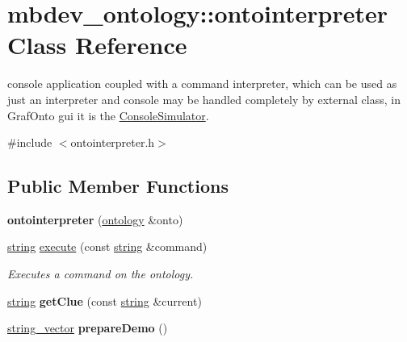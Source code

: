 \hypertarget{classmbdev__ontology_1_1ontointerpreter}{\section{mbdev\-\_\-ontology\-:\-:ontointerpreter \-Class \-Reference}
\label{classmbdev__ontology_1_1ontointerpreter}
}


console application coupled with a command interpreter, which can be used as just an interpreter and console may be handled completely by external class, in \-Graf\-Onto gui it is the \hyperlink{class_console_simulator}{\-Console\-Simulator}.  




{\ttfamily \#include $<$ontointerpreter.\-h$>$}

\subsection*{\-Public \-Member \-Functions}
\begin{DoxyCompactItemize}
\item 
\hypertarget{classmbdev__ontology_1_1ontointerpreter_a505d6a869c6b910cdce6dd993db88770}{{\bfseries ontointerpreter} (\hyperlink{classmbdev__ontology_1_1ontology}{ontology} \&onto)}\label{classmbdev__ontology_1_1ontointerpreter_a505d6a869c6b910cdce6dd993db88770}

\item 
\hyperlink{classmbdev_1_1string}{string} \hyperlink{classmbdev__ontology_1_1ontointerpreter_af636d8cbc49e75f95a64211c105c0678}{execute} (const \hyperlink{classmbdev_1_1string}{string} \&command)
\begin{DoxyCompactList}\small\item\em \-Executes a command on the ontology. \end{DoxyCompactList}\item 
\hypertarget{classmbdev__ontology_1_1ontointerpreter_a8f466b4ce271a964a15b3dcc27eba228}{\hyperlink{classmbdev_1_1string}{string} {\bfseries get\-Clue} (const \hyperlink{classmbdev_1_1string}{string} \&current)}\label{classmbdev__ontology_1_1ontointerpreter_a8f466b4ce271a964a15b3dcc27eba228}

\item 
\hypertarget{classmbdev__ontology_1_1ontointerpreter_a46ee19660d7c38164ef2cb21d37a6866}{\hyperlink{classmbdev_1_1string__vector}{string\-\_\-vector} {\bfseries prepare\-Demo} ()}\label{classmbdev__ontology_1_1ontointerpreter_a46ee19660d7c38164ef2cb21d37a6866}

\end{DoxyCompactItemize}


